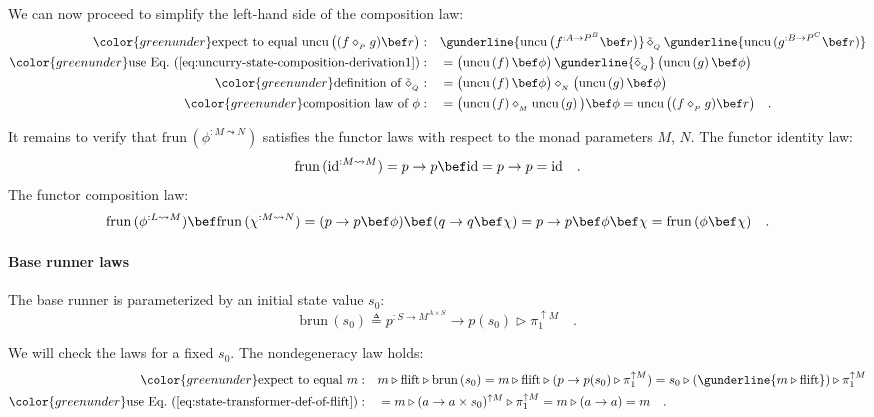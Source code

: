 We can now proceed to simplify the left-hand side of the composition
law:
\begin{align*}
{\color{greenunder}\text{expect to equal }\text{uncu}\,\big((f\diamond_{_{P}}g)\bef r\big):}\quad & \gunderline{\text{uncu}\,\big(f^{:A\rightarrow P^{B}}\bef r\big)}\,\tilde{\diamond}_{_{Q}}\,\gunderline{\text{uncu}\,(g^{:B\rightarrow P^{C}}\bef r)}\\
{\color{greenunder}\text{use Eq.~(\ref{eq:uncurry-state-composition-derivation1})}:}\quad & =\big(\text{uncu}\left(f\right)\bef\phi\big)\,\gunderline{\tilde{\diamond}_{_{Q}}}\,\big(\text{uncu}\left(g\right)\bef\phi\big)\\
{\color{greenunder}\text{definition of }\tilde{\diamond}_{_{Q}}:}\quad & =\big(\text{uncu}\left(f\right)\bef\phi\big)\diamond_{_{N}}\big(\text{uncu}\left(g\right)\bef\phi\big)\\
{\color{greenunder}\text{composition law of }\phi:}\quad & =\big(\text{uncu}\left(f\right)\diamond_{_{M}}\text{uncu}\left(g\right)\big)\bef\phi=\text{uncu}\,\big((f\diamond_{_{P}}g)\bef r\big)\quad.
\end{align*}

It remains to verify that $\text{frun}\,(\phi^{:M\leadsto N})$ satisfies
the functor laws with respect to the monad parameters $M$, $N$.
The functor identity law:
\[
\text{frun}\,(\text{id}^{:M\leadsto M})=p\rightarrow p\bef\text{id}=p\rightarrow p=\text{id}\quad.
\]
The functor composition law:
\[
\text{frun}\,(\phi^{:L\leadsto M})\bef\text{frun}\,(\chi^{:M\leadsto N})=(p\rightarrow p\bef\phi)\bef(q\rightarrow q\bef\chi)=p\rightarrow p\bef\phi\bef\chi=\text{frun}\,(\phi\bef\chi)\quad.
\]


\paragraph{Base runner laws}

The base runner is parameterized by an initial state value $s_{0}$:
\[
\text{brun}\,(s_{0})\triangleq p^{:S\rightarrow M^{A\times S}}\rightarrow p(s_{0})\triangleright\pi_{1}^{\uparrow M}\quad.
\]

We will check the laws for a fixed $s_{0}$. The nondegeneracy law
holds:
\begin{align*}
{\color{greenunder}\text{expect to equal }m:}\quad & m\triangleright\text{flift}\triangleright\text{brun}\,(s_{0})=m\triangleright\text{flift}\triangleright(p\rightarrow p(s_{0})\triangleright\pi_{1}^{\uparrow M})=s_{0}\triangleright(\gunderline{m\triangleright\text{flift}})\triangleright\pi_{1}^{\uparrow M}\\
{\color{greenunder}\text{use Eq.~(\ref{eq:state-transformer-def-of-flift})}:}\quad & =m\triangleright(a\rightarrow a\times s_{0})^{\uparrow M}\triangleright\pi_{1}^{\uparrow M}=m\triangleright(a\rightarrow a)=m\quad.
\end{align*}

